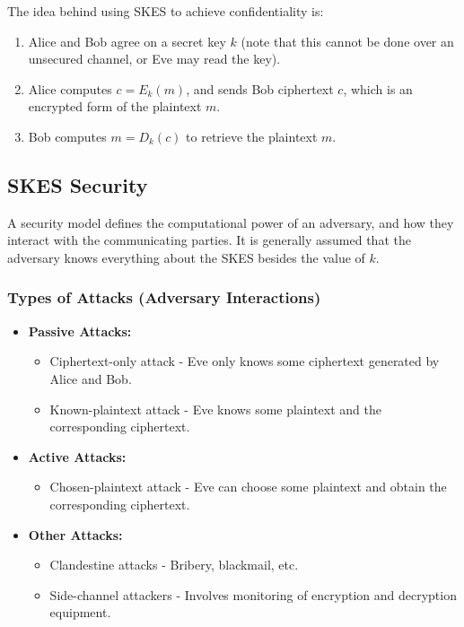 \documentclass[12pt,titlepage]{article}
\begin{document}
      The idea behind using SKES to achieve confidentiality is:
        \begin{enumerate}
          \item Alice and Bob agree on a secret key $k$ (note that this cannot be done over an unsecured
            channel, or Eve may read the key).
          \item Alice computes $c = E_k(m)$, and sends Bob ciphertext $c$, which is an encrypted form of the plaintext $m$.
          \item Bob computes $m = D_k(c)$ to retrieve the plaintext $m$.
        \end{enumerate}

    \subsection{SKES Security}
      A security model defines the computational power of an adversary, and how they interact with the communicating parties.
      It is generally assumed that the adversary knows everything about the SKES besides the value of $k$.

      \subsubsection{Types of Attacks (Adversary Interactions)}
        \begin{itemize}
          \item \textbf{Passive Attacks:}
            \begin{itemize}
              \item Ciphertext-only attack - Eve only knows some ciphertext generated by Alice and Bob.
              \item Known-plaintext attack - Eve knows some plaintext and the corresponding ciphertext.
            \end{itemize}
          \item \textbf{Active Attacks:}
            \begin{itemize}
              \item Chosen-plaintext attack - Eve can choose some plaintext and obtain the corresponding ciphertext.
            \end{itemize}
          \item \textbf{Other Attacks:}
            \begin{itemize}
              \item Clandestine attacks - Bribery, blackmail, etc.
              \item Side-channel attackers - Involves monitoring of encryption and decryption equipment.
            \end{itemize}
        \end{itemize}
\end{document}
